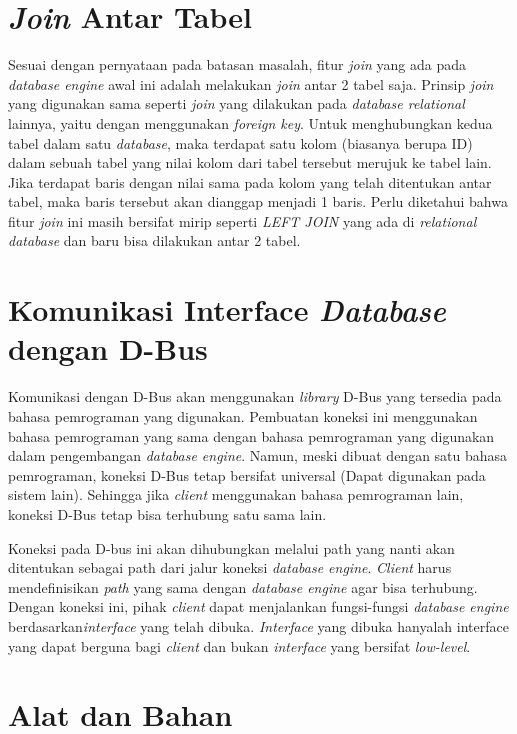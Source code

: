 \section{\emph{Join} Antar Tabel}
Sesuai dengan pernyataan pada batasan masalah, fitur \emph{join} yang ada pada \emph{database engine} awal ini adalah melakukan \emph{join} antar 2 tabel saja.
Prinsip \emph{join} yang digunakan sama seperti \emph{join} yang dilakukan pada \emph{database relational} lainnya, yaitu dengan menggunakan \emph{foreign key}.
Untuk menghubungkan kedua tabel dalam satu \emph{database}, maka terdapat satu kolom (biasanya berupa ID) dalam sebuah tabel yang nilai kolom dari tabel tersebut
merujuk ke tabel lain. Jika terdapat baris dengan nilai sama pada kolom yang telah ditentukan antar tabel, maka baris tersebut akan dianggap menjadi 1 baris.
Perlu diketahui bahwa fitur \emph{join} ini masih bersifat mirip seperti \emph{LEFT JOIN} yang ada di \emph{relational database} dan baru bisa dilakukan antar 2 tabel.


\section{Komunikasi Interface \emph{Database} dengan D-Bus}

Komunikasi dengan D-Bus akan menggunakan \emph{library} D-Bus yang tersedia pada bahasa pemrograman
yang digunakan. Pembuatan koneksi ini menggunakan bahasa pemrograman yang sama dengan bahasa pemrograman yang digunakan
dalam pengembangan \emph{database engine}. Namun, meski dibuat dengan satu bahasa pemrograman, koneksi D-Bus tetap bersifat universal (Dapat digunakan pada sistem lain). 
Sehingga jika \emph{client} menggunakan bahasa pemrograman lain, koneksi D-Bus tetap bisa terhubung satu sama lain. 

Koneksi pada D-bus ini akan dihubungkan melalui path yang nanti akan ditentukan
sebagai path dari jalur koneksi \emph{database engine}. \emph{Client} harus mendefinisikan \emph{path} yang sama dengan 
\emph{database engine} agar bisa terhubung. Dengan koneksi ini, pihak \emph{client} dapat menjalankan fungsi-fungsi 
\emph{database engine} berdasarkan\emph{interface} yang telah dibuka. \emph{Interface} yang dibuka hanyalah
interface yang dapat berguna bagi \emph{client} dan bukan \emph{interface} yang bersifat \emph{low-level}.



\section{Alat dan Bahan}

